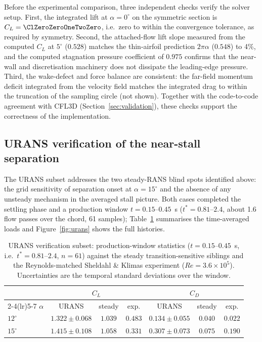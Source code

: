 \documentclass[11pt,a4paper]{article}
\begin{document}
Before the experimental comparison, three independent checks verify the solver setup. First, the integrated lift at $\alpha = 0^\circ$ on the symmetric section is $C_L = \ClZeroZeroOneTwoZero$, i.e.\ zero to within the convergence tolerance, as required by symmetry. Second, the attached-flow lift slope measured from the computed $C_L$ at $5^\circ$ ($0.528$) matches the thin-airfoil prediction $2\pi\alpha$ ($0.548$) to 4\%, and the computed stagnation pressure coefficient of $0.975$ confirms that the near-wall and discretisation machinery does not dissipate the leading-edge pressure. Third, the wake-defect and force balance are consistent: the far-field momentum deficit integrated from the velocity field matches the integrated drag to within the truncation of the sampling circle (not shown). Together with the code-to-code agreement with CFL3D (Section~\ref{sec:validation}), these checks support the correctness of the implementation.

\subsection{URANS verification of the near-stall separation}\label{sec:urans}
The URANS subset addresses the two steady-RANS blind spots identified above: the grid sensitivity of separation onset at $\alpha = 15^\circ$ and the absence of any unsteady mechanism in the averaged stall picture. Both cases completed the settling phase and a production window $t = 0.15$--$0.45$~s ($t^* = 0.81$--$2.4$, about 1.6 flow passes over the chord, 61 samples); Table~\ref{tab:urans} summarises the time-averaged loads and Figure~\ref{fig:urans} shows the full histories.

\begin{table}[htbp]
  \centering
  \caption{URANS verification subset: production-window statistics ($t = 0.15$--$0.45$~s, i.e.\ $t^* = 0.81$--$2.4$, $n = 61$) against the steady transition-sensitive siblings and the Reynolds-matched Sheldahl \& Klimas experiment ($Re = 3.6\times10^5$). Uncertainties are the temporal standard deviations over the window.}
  \label{tab:urans}
  \begin{tabular}{lcccccc}
    \toprule
    & \multicolumn{3}{c}{$C_L$} & \multicolumn{3}{c}{$C_D$} \\
    \cmidrule(lr){2-4}\cmidrule(lr){5-7}
    $\alpha$ & URANS & steady & exp. & URANS & steady & exp. \\
    \midrule
    $12^\circ$ & $1.322 \pm 0.068$ & $1.039$ & $0.483$ & $0.134 \pm 0.055$ & $0.040$ & $0.022$ \\
    $15^\circ$ & $1.415 \pm 0.108$ & $1.058$ & $0.331$ & $0.307 \pm 0.073$ & $0.075$ & $0.190$ \\
    \bottomrule
  \end{tabular}
\end{table}
\end{document}
